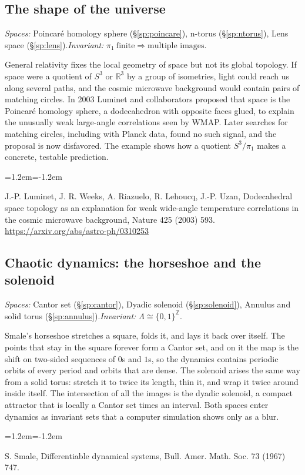 \documentclass[11pt,twoside]{book}
\begin{document}
\subsection{The shape of the universe}\label{app:app-cosmic}
\noindent\textit{Spaces:} Poincaré homology sphere (\S\ref{sp:poincare}), n-torus (\S\ref{sp:ntorus}), Lens space (\S\ref{sp:lens}).\enspace\textit{Invariant:} $\pi_1\ \text{finite}\Rightarrow\text{multiple images}$.

General relativity fixes the local geometry of space but not its global topology. If space were a quotient of $S^3$ or $\mathbb{R}^3$ by a group of isometries, light could reach us along several paths, and the cosmic microwave background would contain pairs of matching circles. In 2003 Luminet and collaborators proposed that space is the Poincaré homology sphere, a dodecahedron with opposite faces glued, to explain the unusually weak large-angle correlations seen by WMAP. Later searches for matching circles, including with Planck data, found no such signal, and the proposal is now disfavored. The example shows how a quotient $S^3/\pi_1$ makes a concrete, testable prediction.
\begin{list}{}{\leftmargin=1.2em\itemindent=-1.2em\itemsep=0pt}\small \item J.-P. Luminet, J. R. Weeks, A. Riazuelo, R. Lehoucq, J.-P. Uzan, Dodecahedral space topology as an explanation for weak wide-angle temperature correlations in the cosmic microwave background, Nature 425 (2003) 593. \url{https://arxiv.org/abs/astro-ph/0310253}\end{list}
\subsection{Chaotic dynamics: the horseshoe and the solenoid}\label{app:app-chaos}
\noindent\textit{Spaces:} Cantor set (\S\ref{sp:cantor}), Dyadic solenoid (\S\ref{sp:solenoid}), Annulus and solid torus (\S\ref{sp:annulus}).\enspace\textit{Invariant:} $\Lambda\cong\{0,1\}^{\mathbb{Z}}$.

Smale's horseshoe stretches a square, folds it, and lays it back over itself. The points that stay in the square forever form a Cantor set, and on it the map is the shift on two-sided sequences of $0$s and $1$s, so the dynamics contains periodic orbits of every period and orbits that are dense. The solenoid arises the same way from a solid torus: stretch it to twice its length, thin it, and wrap it twice around inside itself. The intersection of all the images is the dyadic solenoid, a compact attractor that is locally a Cantor set times an interval. Both spaces enter dynamics as invariant sets that a computer simulation shows only as a blur.
\begin{list}{}{\leftmargin=1.2em\itemindent=-1.2em\itemsep=0pt}\small \item S. Smale, Differentiable dynamical systems, Bull. Amer. Math. Soc. 73 (1967) 747.\end{list}
\end{document}
